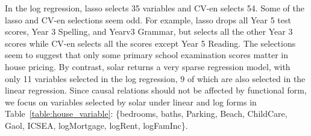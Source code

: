\documentclass[11pt,review,authoryear]{elsarticle}
\begin{document}
In the log regression, lasso selects 35 variables and CV-en selects 54. Some of the lasso and CV-en selections seem odd. For example, lasso drops all Year 5 test scores, Year 3 Spelling, and Yearv3 Grammar, but selects all the other Year 3 scores while CV-en selects all the scores except Year 5 Reading. The selections seem to suggest that only some primary school examination scores matter in house pricing. By contrast, solar returns a very sparse regression model, with only 11 variables selected in the log regression, 9 of which are also selected in the linear regression. Since causal relations should not be affected by functional form, we focus on variables selected by solar under linear and log forms in Table~\ref{table:house_variable}: \{bedrooms, baths, Parking, Beach, ChildCare, Gaol, ICSEA, logMortgage, logRent, logFamInc\}.
\end{document}
